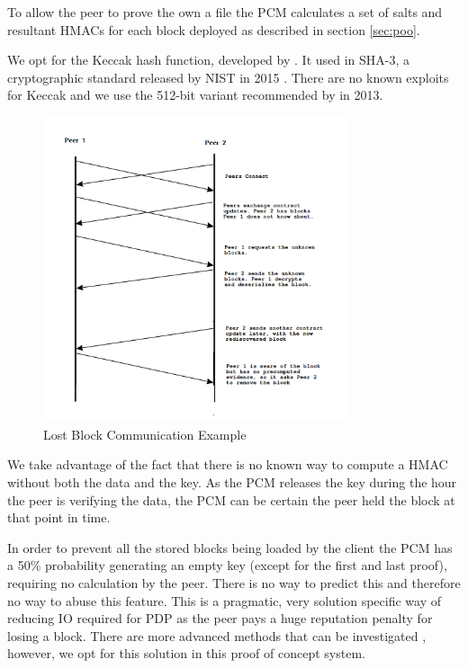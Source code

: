 \documentclass[11pt, a4paper, twocolumn, twoside]{report}
\begin{document}
To allow the peer to prove the own a file the PCM calculates a set of salts and resultant HMACs for each block deployed as described in section \ref{sec:poo}.

We opt for the Keccak hash function, developed by \cite{bertoni2009keccak}. It used in SHA-3, a cryptographic standard released by NIST in 2015 \citep{paul2015nist}. There are no known exploits for Keccak and we use the 512-bit variant recommended by \cite{bertoni2009keccak} in 2013.

\begin{figure}[ht]
 \centering
 \includegraphics[width=0.8\textwidth]{lost-block}
 \caption{Lost Block Communication Example}
 \label{fig:lost-block}
\end{figure}

We take advantage of the fact that there is no known way to compute a HMAC without both the data and the key. As the PCM releases the key during the hour the peer is verifying the data, the PCM can be certain the peer held the block at that point in time. \citep{ateniese2011remote}

In order to prevent all the stored blocks being loaded by the client the PCM has a 50\% probability generating an empty key (except for the first and last proof), requiring no calculation by the peer. There is no way to predict this and therefore no way to abuse this feature. This is a pragmatic, very solution specific way of reducing IO required for PDP as the peer pays a huge reputation penalty for losing a block. There are more advanced methods that can be investigated \citep*{ateniese2011remote, shacham2008compact, bowers2009proofs}, however, we opt for this solution in this proof of concept system.
\end{document}
